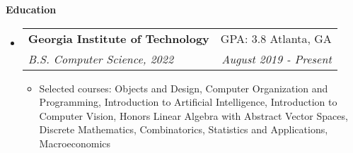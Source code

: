 \documentclass[letterpaper,10pt]{article}
\makeatletter
\newcommand{\resitem}[1]{\item #1 \vspace{-2pt}}
\newcommand{\resheading}[1]{{\large \colorbox{mygrey}{\begin{minipage}{\textwidth}{\textbf{#1 \vphantom{p\^{E}}}}\end{minipage}}}}
\newcommand{\ressubheading}[4]{
\begin{tabular*}{7.0in}{l@{\extracolsep{\fill}}r}
		\textbf{#1} & #2 \\
		\textit{#3} & \textit{#4} \\
\end{tabular*}\vspace{-6pt}}
\makeatother
\begin{document}
\resheading{Education}
\begin{itemize}
\item[]  %
    \ressubheading{Georgia Institute of Technology}{GPA: 3.8 \hspace{1em} Atlanta, GA}{B.S. Computer Science, 2022}{August 2019 - Present}
	\begin{itemize}
	    \resitem{Selected courses: Objects and Design, Computer Organization and Programming, Introduction to Artificial Intelligence, Introduction to Computer Vision, Honors Linear Algebra with Abstract Vector Spaces, Discrete Mathematics, Combinatorics, Statistics and Applications, Macroeconomics}
	\end{itemize}
\end{itemize}
\end{document}
